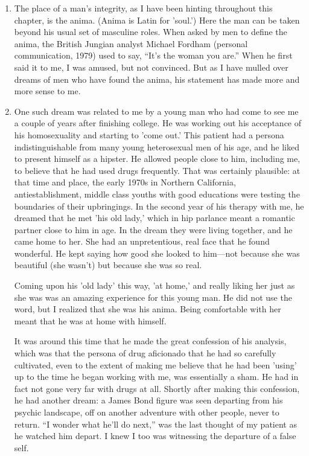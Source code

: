 \begin{enumerate}

\item {} The place of a man's integrity, as I have been
hinting throughout this chapter, is the anima. (Anima is Latin for 'soul.')
Here the man can be taken beyond his usual set of masculine roles. When asked
by men to define the anima, the British Jungian analyst Michael Fordham
(personal communication, 1979) used to say, ``It's the woman you are.'' When he
first said it to me, I was amused, but not convinced. But as I have mulled over
dreams of men who have found the anima, his statement has made more and more
sense to me.

\item {} One such dream was related to
me by a young man who had come to see me a couple of years after finishing
college. He was working out his acceptance of his homosexuality and starting to
'come out.' This patient had a persona indistinguishable from many young
heterosexual men of his age, and he liked to present himself as a hipster. He
allowed people close to him, including me, to believe that he had used drugs
frequently. That was certainly plausible: at that time and place, the early
1970s in Northern California, antiestablishment, middle class youths with good
educations were testing the boundaries of their upbringings. In the second year
of his therapy with me, he dreamed that he met 'his old lady,' which in hip
parlance meant a romantic partner close to him in age. In the dream they were
living together, and he came home to her. She had an unpretentious, real face
that he found wonderful. He kept saying how good she looked to him—not because
she was beautiful (she wasn't) but because she was so real.

Coming upon his 'old lady' this way, 'at home,' and really liking her just as
she was was an amazing experience for this young man. He did not use the word,
but I realized that she was his anima. Being comfortable with her meant that he
was at home with himself.

It was around this time that he made the great confession of his analysis,
which was that the persona of drug aficionado that he had so carefully
cultivated, even to the extent of making me believe that he had been 'using' up
to the time he began working with me, was essentially a sham. He had in fact
not gone very far with drugs at all. Shortly after making this confession, he
had another dream: a James Bond figure was seen departing from his psychic
landscape, off on another adventure with other people, never to return. ``I
wonder what he'll do next,'' was the last thought of my patient as he watched
him depart. I knew I too was witnessing the departure of a false self.


\end{enumerate}
